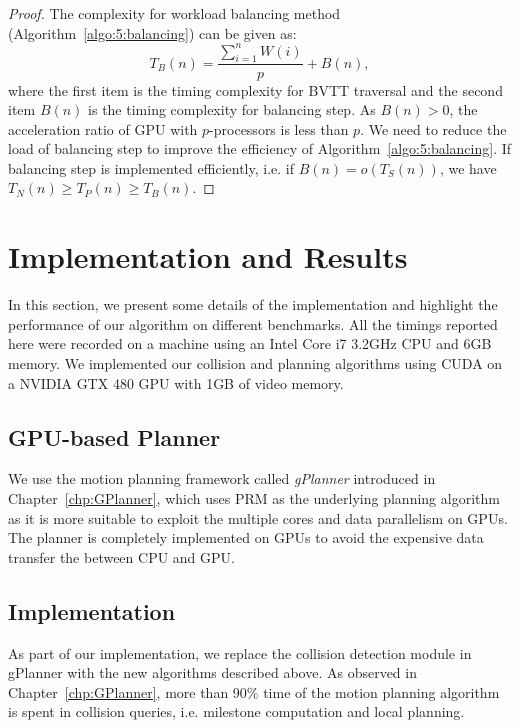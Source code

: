 \begin{proof}
The complexity for workload balancing method (Algorithm~\ref{algo:5:balancing}) can be given as: $$T_B(n) = \frac{\sum_{i=1}^n W(i)}{p} + B(n),$$ where the first item is the timing complexity for BVTT traversal and the second item $B(n)$ is the timing complexity for balancing step. As $B(n) > 0$, the acceleration ratio of GPU with $p$-processors is less than $p$. We need to reduce the load of balancing step to improve the efficiency of Algorithm~\ref{algo:5:balancing}. If balancing step is implemented efficiently, i.e. if $B(n) = o(T_S(n))$, we have $T_N(n) \geq T_P(n) \geq T_B(n)$.
\end{proof}



\section{Implementation and Results}
\label{sec:5:result}


In this section, we present some details of the implementation and highlight the performance of our algorithm
on different benchmarks. All the timings reported here were recorded on a machine using an Intel Core i7 3.2GHz CPU and 6GB
memory. We implemented our collision and planning algorithms using CUDA on a NVIDIA GTX 480 GPU with 1GB of video memory.

\subsection{GPU-based Planner}
We use the motion planning framework called \emph{gPlanner} introduced in Chapter~\ref{chp:GPlanner}, which uses PRM
as the underlying planning algorithm as it is more suitable to exploit the multiple cores and data parallelism on GPUs. The planner is completely implemented on GPUs to avoid the expensive data transfer the between CPU and GPU.


\subsection{Implementation}
As part of our implementation, we replace the collision detection module in gPlanner with the new algorithms described above.
As observed in Chapter~\ref{chp:GPlanner}, more than 90\% time of the motion planning algorithm is spent in collision queries, i.e. milestone computation and local planning.

